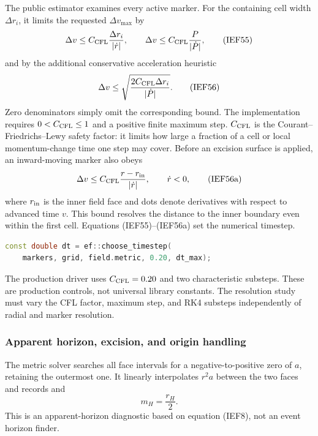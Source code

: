 The public estimator  examines every active marker.
For the containing cell width \(\Delta r_i\), it limits the requested
\(\Delta v_{\max}\) by
\[
 \Delta v\le C_{\rm CFL}\frac{\Delta r_i}{|\dot r|},
 \qquad
 \Delta v\le C_{\rm CFL}\frac{P}{|\dot P|},            \tag{IEF55}
\]
and by the additional conservative acceleration heuristic
\[
 \Delta v\le
 \sqrt{\frac{2C_{\rm CFL}\Delta r_i}{|\dot P|}}.       \tag{IEF56}
\]
Zero denominators simply omit the corresponding bound.  The implementation
requires \(0<C_{\rm CFL}\le1\) and a positive finite maximum step.
\(C_{\rm CFL}\) is the Courant--Friedrichs--Lewy safety factor: it limits how
large a fraction of a cell or local momentum-change time one step may cover.
Before an excision surface is applied, an inward-moving marker also obeys
\[
 \Delta v\le C_{\rm CFL}\frac{r-r_{\rm in}}{|\dot r|},
 \qquad \dot r<0,                                      \tag{IEF56a}
\]
where \(r_{\rm in}\) is the inner field face and dots denote derivatives
with respect to advanced time \(v\). This bound resolves the distance to
the inner boundary even within the first cell. Equations (IEF55)--(IEF56a)
set the numerical timestep.

\begin{lstlisting}[language=C++,basicstyle=\ttfamily\scriptsize]
const double dt = ef::choose_timestep(
    markers, grid, field.metric, 0.20, dt_max);
\end{lstlisting}
The production driver uses \(C_{\rm CFL}=0.20\) and two characteristic
substeps.  These are production controls, not universal library constants.
The resolution study must vary the CFL factor, maximum step, and RK4
substeps independently of radial and marker resolution.

\subsubsection{Apparent horizon, excision, and origin handling}

The metric solver searches all face intervals for a negative-to-positive
zero of \(a\), retaining the outermost one.  It linearly interpolates
\(r^2a\) between the two faces and records
 and
\[
 m_H=\frac{r_H}{2}.                                     \tag{IEF57}
\]
This is an apparent-horizon diagnostic based on equation (IEF8), not an event
horizon finder.

